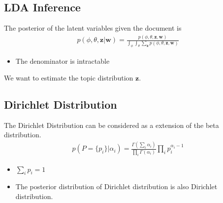 \subsection{LDA Inference}
The posterior of the latent variables given the document is
\begin{align*}
	p(\phi, \theta, \mathbf{z}|\mathbf{w}) = \frac{p(\phi, \theta, \mathbf{z},\mathbf{w})}{\int_{\phi}\int_{\theta}\sum_{\mathbf{z}}p(\phi, \theta, \mathbf{z},\mathbf{w})}
\end{align*}
\begin{itemize}
	\item The denominator is intractable
\end{itemize}
We want to estimate the topic distribution $\mathbf{z}$. 

\subsection{Dirichlet Distribution}
The Dirichlet Distribution can be considered as a extension of the beta distribution. 
\begin{align}
	p(P=\{p_i\}|\alpha_i) = \frac{\Gamma(\sum_i\alpha_i)}{\prod_i\Gamma(\alpha_i)}\prod_ip_i^{\alpha_i-1}
	\label{eq:dirichlet_dist}
\end{align}
\begin{itemize}
	\item $\sum_ip_i = 1$
	\item The posterior distribution of Dirichlet distribution is also Dirichlet distribution. 
\end{itemize}
